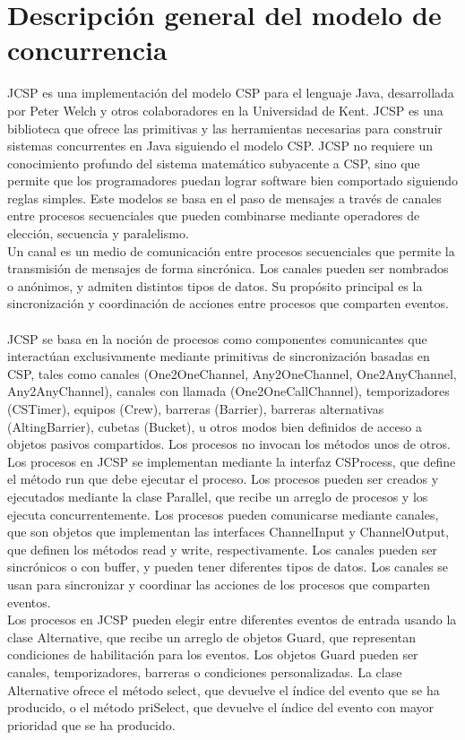 \section*{Descripción general del modelo de concurrencia}
JCSP es una implementación del modelo CSP para el lenguaje Java, desarrollada por Peter Welch y otros colaboradores en la Universidad de Kent. JCSP es una biblioteca que ofrece las primitivas y las herramientas necesarias para construir sistemas concurrentes en Java siguiendo el modelo CSP. JCSP no requiere un conocimiento profundo del sistema matemático subyacente a CSP, sino que permite que los programadores puedan lograr software bien comportado siguiendo reglas simples. Este modelos se basa en el paso de mensajes a través de canales entre procesos secuenciales que pueden combinarse mediante operadores de elección, secuencia y paralelismo.\\
Un canal es un medio de comunicación entre procesos secuenciales que permite la transmisión de mensajes de forma sincrónica. Los canales pueden ser nombrados o anónimos, y admiten distintos tipos de datos. Su propósito principal es la sincronización y coordinación de acciones entre procesos que comparten eventos.\\\\
JCSP se basa en la noción de procesos como componentes comunicantes que interactúan exclusivamente mediante primitivas de sincronización basadas en CSP, tales como canales (One2OneChannel, Any2OneChannel, One2AnyChannel, Any2AnyChannel), canales con llamada (One2OneCallChannel), temporizadores (CSTimer), equipos (Crew), barreras (Barrier), barreras alternativas (AltingBarrier), cubetas (Bucket), u otros modos bien definidos de acceso a objetos pasivos compartidos. Los procesos no invocan los métodos unos de otros.\\
Los procesos en JCSP se implementan mediante la interfaz CSProcess, que define el método run que debe ejecutar el proceso. Los procesos pueden ser creados y ejecutados mediante la clase Parallel, que recibe un arreglo de procesos y los ejecuta concurrentemente. Los procesos pueden comunicarse mediante canales, que son objetos que implementan las interfaces ChannelInput y ChannelOutput, que definen los métodos read y write, respectivamente. Los canales pueden ser sincrónicos o con buffer, y pueden tener diferentes tipos de datos. Los canales se usan para sincronizar y coordinar las acciones de los procesos que comparten eventos.\\
Los procesos en JCSP pueden elegir entre diferentes eventos de entrada usando la clase Alternative, que recibe un arreglo de objetos Guard, que representan condiciones de habilitación para los eventos. Los objetos Guard pueden ser canales, temporizadores, barreras o condiciones personalizadas. La clase Alternative ofrece el método select, que devuelve el índice del evento que se ha producido, o el método priSelect, que devuelve el índice del evento con mayor prioridad que se ha producido.\\\\
